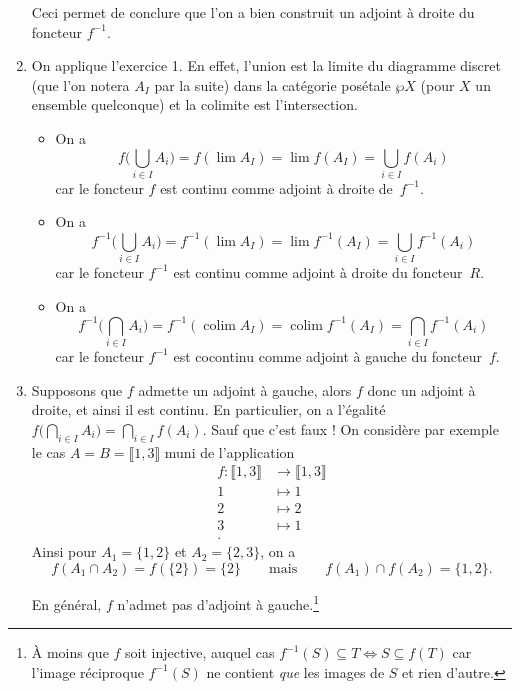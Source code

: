 \documentclass{../../td}
\makeatletter
\newcommand\showfootnote{%
  \tfn@tablefootnoteprintout%
  \gdef\tfn@fnt{0}%
}
\makeatother
\begin{document}
\begin{enumerate}
      Ceci permet de conclure que l'on a bien construit un adjoint à droite du foncteur $f^{-1}$. 
    \item On applique l'exercice 1. En effet, l'union est la limite du diagramme discret (que l'on notera $A_I$ par la suite) dans la catégorie posétale $\wp X$ (pour $X$ un ensemble quelconque) et la colimite est l'intersection.
      \begin{itemize}
        \item On a \[
          f\Big(\bigcup_{i \in  I} A_i\Big) = f(\lim A_I) = \lim f(A_I) = \bigcup_{i \in  I} f(A_i)
          \]  car le foncteur $f$ est continu comme adjoint à droite de~$f^{-1}$.
        \item On a \[
          f^{-1}\Big(\bigcup_{i \in  I} A_i\Big) = f^{-1}(\lim A_I) = \lim f^{-1}(A_I) = \bigcup_{i \in  I} f^{-1}(A_i)
          \]  car le foncteur $f^{-1}$ est continu comme adjoint à droite du foncteur~$R$.
        \item On a \[
          f^{-1}\Big(\bigcap_{i \in  I} A_i\Big) = f^{-1}(\operatorname{colim} A_I) = \operatorname{colim} f^{-1}(A_I) = \bigcap_{i \in  I} f^{-1}(A_i)
          \]  car le foncteur $f^{-1}$ est cocontinu comme adjoint à gauche du foncteur~$f$.
      \end{itemize}
    \item Supposons que $f$ admette un adjoint à gauche, alors $f$ donc un adjoint à droite, et ainsi il est continu.
      En particulier, on a l'égalité $f\big(\bigcap_{i \in  I} A_i \big) = \bigcap_{i \in I} f(A_i)$.
      Sauf que c'est faux !
      On considère par exemple le cas $A = B = \llbracket 1,3\rrbracket$ muni de l'application \begin{align*}
        f: \llbracket 1,3\rrbracket  &\longrightarrow \llbracket 1,3\rrbracket \\
        1 &\longmapsto 1\\
        2 &\longmapsto 2\\
        3 &\longmapsto 1\\
      .\end{align*}
      Ainsi pour $A_1 = \{1,2\}$ et $A_2 = \{2,3\}$, on a \[
      f(A_1 \cap A_2) = f(\{2\}) = \{2\}  \quad\quad \text{mais}\quad\quad f(A_1) \cap f(A_2) = \{1,2\} 
      .\]

      En général, $f$ n'admet pas d'adjoint à gauche.\footnote{À moins que $f$ soit injective, auquel cas $f^{-1}(S) \subseteq T \iff S \subseteq f(T)$ car l'image réciproque $f^{-1}(S)$ ne contient \textit{que} les images de $S$ et rien d'autre.}\showfootnote
  \end{enumerate}
\end{document}
